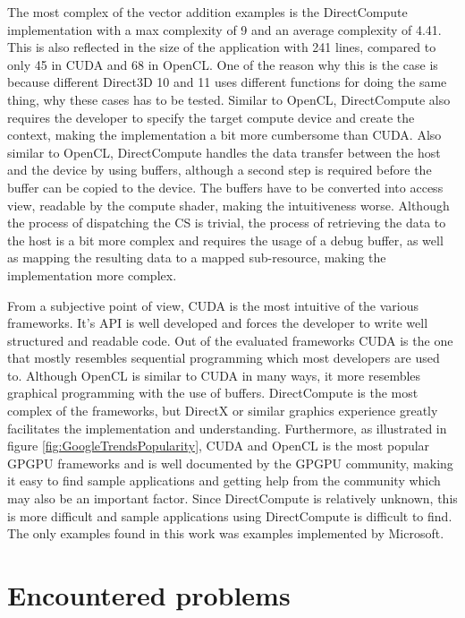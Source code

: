 The most complex of the vector addition examples is the DirectCompute implementation with a max complexity of 9 and an average complexity of 4.41. This is also reflected in the size of the application with 241 lines, compared to only 45 in CUDA and 68 in OpenCL. One of the reason why this is the case is because different Direct3D 10 and 11 uses different functions for doing the same thing, why these cases has to be tested. Similar to OpenCL, DirectCompute also requires the developer to specify the target compute device and create the context, making the implementation a bit more cumbersome than CUDA. Also similar to OpenCL, DirectCompute handles the data transfer between the host and the device by using buffers, although a second step is required before the buffer can be copied to the device. The buffers have to be converted into access view, readable by the compute shader, making the intuitiveness worse. Although the process of dispatching the CS is trivial, the process of retrieving the data to the host is a bit more complex and requires the usage of a debug buffer, as well as mapping the resulting data to a mapped sub-resource, making the implementation more complex. 


From a subjective point of view, CUDA is the most intuitive of the various frameworks. It's API is well developed and forces the developer to write well structured and readable code. Out of the evaluated frameworks CUDA is the one that mostly resembles sequential programming which most developers are used to. Although OpenCL is similar to CUDA in many ways, it more resembles graphical programming with the use of buffers. DirectCompute is the most complex of the frameworks, but DirectX or similar graphics experience greatly facilitates the implementation and understanding. Furthermore, as illustrated in figure \ref{fig:GoogleTrendsPopularity}, CUDA and OpenCL is the most popular GPGPU frameworks and is well documented by the GPGPU community, making it easy to find sample applications and getting help from the community which may also be an important factor. Since DirectCompute is relatively unknown, this is more difficult and sample applications using DirectCompute is difficult to find. The only examples found in this work was examples implemented by Microsoft. 





\section{Encountered problems}

